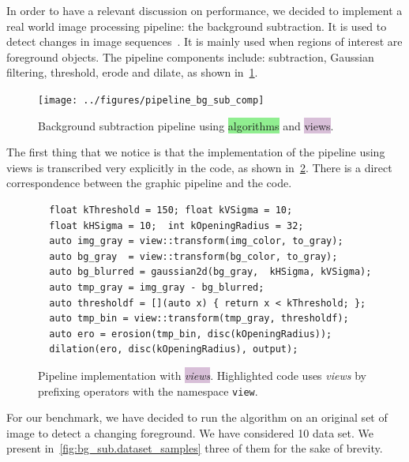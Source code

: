 In order to have a relevant discussion on performance, we decided to implement a real world image processing pipeline:
the background subtraction. It is used to detect changes in image sequences~\parencite{opencv.bg_sub}. It is mainly used
when regions of interest are foreground objects. The pipeline components include: subtraction, Gaussian filtering,
threshold, erode and dilate, as shown in~\cref{fig:view.comp.sub_bg}.

\begin{figure}[htbp]
  \centering
  \texttt{[image: ../figures/pipeline\_bg\_sub\_comp]}
  \caption{Background subtraction pipeline using \colorbox{lightgreen}{algorithms} and
    \colorbox{thistle}{views}.}
  \label{fig:view.comp.sub_bg}
\end{figure}

The first thing that we notice is that the implementation of the pipeline using views is transcribed very explicitly in
the code, as shown in~\cref{fig:view.comp.sub_bg.view_code}. There is a direct correspondence between the graphic
pipeline and the code.

\begin{figure}
  \begin{verbatim}
  float kThreshold = 150; float kVSigma = 10;
  float kHSigma = 10;  int kOpeningRadius = 32;
  auto img_gray = view::transform(img_color, to_gray);
  auto bg_gray  = view::transform(bg_color, to_gray);
  auto bg_blurred = gaussian2d(bg_gray,  kHSigma, kVSigma);
  auto tmp_gray = img_gray - bg_blurred;
  auto thresholdf = [](auto x) { return x < kThreshold; };
  auto tmp_bin = view::transform(tmp_gray, thresholdf);
  auto ero = erosion(tmp_bin, disc(kOpeningRadius));
  dilation(ero, disc(kOpeningRadius), output);
  \end{verbatim}
  \caption{Pipeline implementation with \colorbox{thistle}{\emph{views}}. Highlighted code uses \emph{views} by
    prefixing operators with the namespace \texttt{view}.}
  \label{fig:view.comp.sub_bg.view_code}
\end{figure}

For our benchmark, we have decided to run the algorithm on an original set of image to detect a changing foreground.
We have considered 10 data set. We present in~\cref{fig:bg_sub.dataset_samples} three of them for the sake of brevity.

